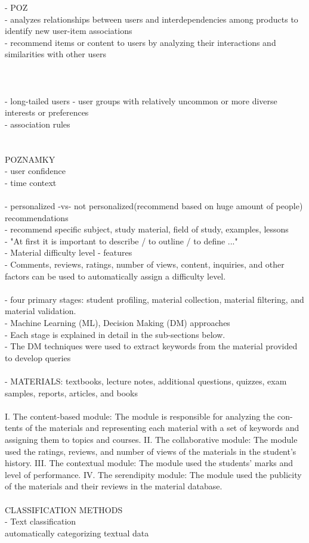 \documentclass[10pt,oneside,english,a4paper]{article}
\begin{document}
\clearpage{}
- POZ\\
- analyzes relationships between users  and interdependencies among products to identify new user-item associations\\
- recommend items or content to users by analyzing their interactions and similarities with other users\\\\
\cite{5197422}\\\\
%
- long-tailed users - user groups with relatively uncommon or more diverse interests or preferences\\
- association rules\\
\cite{Yan2024}\\\\
%
\clearpage{}
POZNAMKY\\
- user confidence\\
- time context\\\\
- personalized -vs- not personalized(recommend based on huge amount of people) recommendations\\
- recommend specific subject, study material, field of study, examples, lessons\\
- "At first it is important to describe / to outline / to define ..."\\
%
%
- Material difficulty level - features\\
- Comments, reviews, ratings, number of views, content, inquiries, and other factors can be used to automatically assign a difficulty level.\\\\
- four primary stages: student profiling, material collection, material filtering, and material validation. \\
- Machine Learning (ML), Decision Making (DM) approaches\\
- Each stage is explained in detail in the sub-sections below.\\
- The DM techniques were used to extract keywords from the material provided to develop queries\\\\
- MATERIALS: textbooks, lecture notes, additional questions, quizzes, exam samples, reports, articles, and books\\\\
%
I. The content-based module: The module is responsible for analyzing the con-
tents of the materials and representing each material with a set of keywords and
assigning them to topics and courses.
II. The collaborative module: The module used the ratings, reviews, and number of
views of the materials in the student’s history.
III. The contextual module: The module used the students’ marks and level of
performance.
IV. The serendipity module: The module used the publicity of the materials and their
reviews in the material database.
\cite{Zayet20237487}\\\\
%
CLASSIFICATION METHODS\\
- Text classification\\
automatically categorizing textual data
\end{document}
